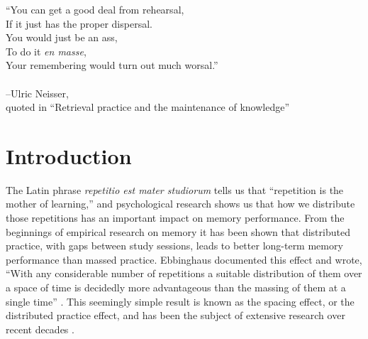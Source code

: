 
\begin{center}

\vspace{5cm}

``You can get a good deal from rehearsal,\\
If it just has the proper dispersal.\\
You would just be an ass,\\
To do it \textit{en masse},\\
Your remembering would turn out much worsal.''\\
~\\
--Ulric Neisser,\\
{\small quoted in ``Retrieval practice and the maintenance of knowledge'' \cite{Bjor1988}}
\end{center}

\newpage

\section{Introduction}



The Latin phrase \textit{repetitio est mater studiorum} tells us that ``repetition is the mother of learning,'' and psychological research shows us that how we distribute those repetitions has an important impact on memory performance.  From the beginnings of empirical research on memory it has been shown that distributed practice, with gaps between study sessions, leads to better long-term memory performance than massed practice.  Ebbinghaus documented this effect and wrote, ``With any considerable number of repetitions a suitable distribution of them over a space of time is decidedly more advantageous than the massing of them at a single time'' \cite[p.~89]{Ebbi1885}.  This seemingly simple result is known as the spacing effect, or the distributed practice effect, and has been the subject of extensive research over recent decades \cite<for reviews, see>{CepeEtal2006,CepeEtal2009,DelaEtal2010}.



